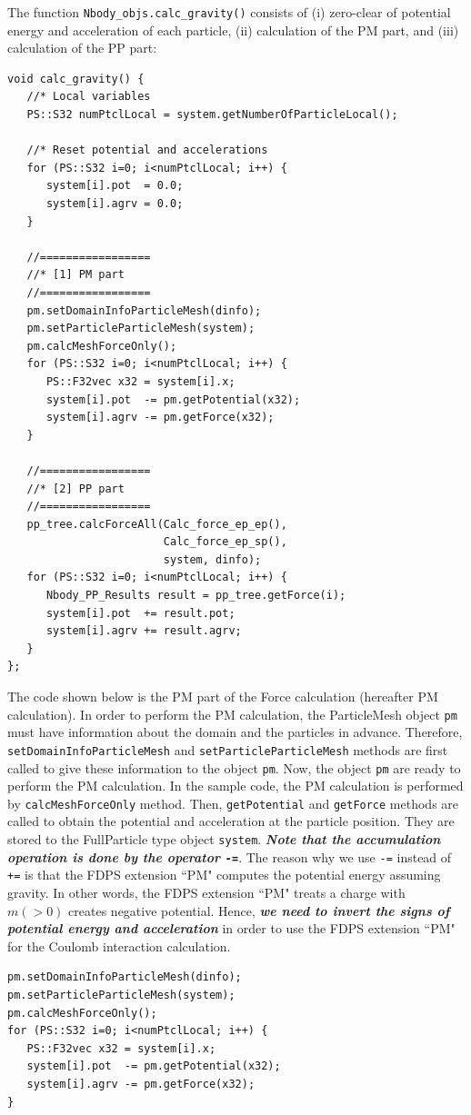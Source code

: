 The function \texttt{Nbody\_objs.calc\_gravity()} consists of (i) zero-clear of potential energy and acceleration of each particle, (ii) calculation of the PM part, and (iii) calculation of the PP part:
\begin{lstlisting}[caption=Interaction calculation]
void calc_gravity() {
   //* Local variables
   PS::S32 numPtclLocal = system.getNumberOfParticleLocal();

   //* Reset potential and accelerations
   for (PS::S32 i=0; i<numPtclLocal; i++) {
      system[i].pot  = 0.0;
      system[i].agrv = 0.0;
   }

   //=================
   //* [1] PM part 
   //=================
   pm.setDomainInfoParticleMesh(dinfo);
   pm.setParticleParticleMesh(system);
   pm.calcMeshForceOnly();
   for (PS::S32 i=0; i<numPtclLocal; i++) {
      PS::F32vec x32 = system[i].x;
      system[i].pot  -= pm.getPotential(x32);
      system[i].agrv -= pm.getForce(x32);
   }

   //=================
   //* [2] PP part 
   //=================
   pp_tree.calcForceAll(Calc_force_ep_ep(),
                        Calc_force_ep_sp(),
                        system, dinfo);
   for (PS::S32 i=0; i<numPtclLocal; i++) {
      Nbody_PP_Results result = pp_tree.getForce(i);
      system[i].pot  += result.pot;
      system[i].agrv += result.agrv;
   }
};
\end{lstlisting}

The code shown below is the PM part of the Force calculation (hereafter PM calculation). In order to perform the PM calculation, the \textsf{ParticleMesh} object \texttt{pm} must have information about the domain and the particles in advance. Therefore, \texttt{setDomainInfoParticleMesh} and \texttt{setParticleParticleMesh} methods are first called to give these information to the object \texttt{pm}. Now, the object \texttt{pm} are ready to perform the PM calculation. In the sample code, the PM calculation is performed by \texttt{calcMeshForceOnly} method. Then, \texttt{getPotential} and \texttt{getForce} methods are called to obtain the potential and acceleration at the particle position. They are stored to the \textsf{FullParticle} type object \texttt{system}. \textit{\textbf{Note that the accumulation operation is done by the operator \texttt{-=}}}. The reason why we use \texttt{-=} instead of \texttt{+=} is that the FDPS extension ``\textsf{PM}" computes the potential energy assuming gravity. In other words, the FDPS extension ``\textsf{PM}" treats a charge with $m(>0)$ creates negative potential. Hence, \textit{\textbf{we need to invert the signs of potential energy and acceleration}} in order to use the FDPS extension ``\textsf{PM}" for the Coulomb interaction calculation.
\begin{lstlisting}[caption=PM part of Force calculation]
pm.setDomainInfoParticleMesh(dinfo);
pm.setParticleParticleMesh(system);
pm.calcMeshForceOnly();
for (PS::S32 i=0; i<numPtclLocal; i++) {
   PS::F32vec x32 = system[i].x;
   system[i].pot  -= pm.getPotential(x32);
   system[i].agrv -= pm.getForce(x32);
}
\end{lstlisting}

